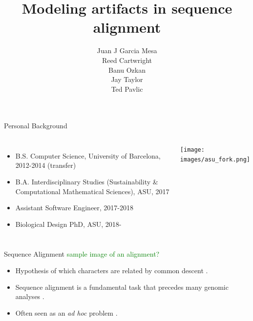 \documentclass{beamer}
\title[Artifacts in sequence alignment]{Modeling artifacts in sequence alignment}
\author[JJ Garcia Mesa]{Juan J Garcia Mesa\\ \vspace{2em}
						{\small Reed Cartwright\\
						Banu Ozkan\\
						Jay Taylor\\
						Ted Pavlic}}
\date{}
\newcommand{\green}[1]{\textcolor{green}{#1}}
\begin{document}
\maketitle

\begin{frame}{Personal Background} %
\begin{columns}
\begin{itemize}
	\setlength\itemsep{1em}
	\item B.S. Computer Science, University of Barcelona, 2012-2014 (transfer)
	\item B.A. Interdisciplinary Studies (Sustainability \& Computational
		Mathematical Sciences), ASU, 2017
	\item Assistant Software Engineer, 2017-2018
	\item Biological Design PhD, ASU, 2018-
\end{itemize}
\texttt{[image: images/asu\_fork.png]}
\end{columns}
\end{frame} %

\begin{frame}{Sequence Alignment} %
\green{sample image of an alignment?}
\vspace{2em}
\begin{itemize}
	\setlength\itemsep{1em}
	\item Hypothesis of which characters are related by common descent \parencite{problems_cartwright_2009}.
	\item Sequence alignment is a fundamental task that precedes many genomic
			analyses \parencite{sequence_alignment_rosenberg_2009}.
	\item Often seen as an \textit{ad hoc} problem \cite{morrison_MSA_2018}.
\end{itemize}
\end{frame} %
\end{document}
